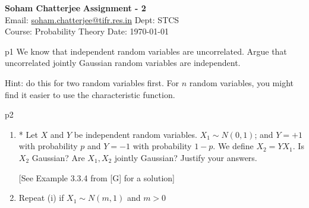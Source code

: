 \documentclass[a4paper, 11pt]{article}
\begin{document}
	
	
	\textsf{\noindent \large\textbf{Soham Chatterjee} \hfill \textbf{Assignment - 2}\\
		Email: \href{soham.chatterjee@tifr.res.in}{soham.chatterjee@tifr.res.in} \hfill Dept: STCS\\
		\normalsize Course: Probability Theory \hfill Date: \today}
	
	
\begin{problem}{%
	}{p1%
}
We know that independent random variables are uncorrelated. Argue that uncorrelated
jointly Gaussian random variables are independent.

Hint: do this for two random variables first. For $n$ random variables, you might find it
easier to use the characteristic function.
\end{problem}

\begin{problem}{%
	}{p2%
	}
\begin{enumerate}[label=(\roman*)]
	\item * Let $X$ and $Y$ be independent random variables. $X_1\sim N(0,1)$; and $Y=+1$ with probability $p$ and $Y=-1$ with probability $1-p$. We define $X_2=YX_1$. Is $X_2$ Gaussian? Are $X_1,X_2$ jointly Gaussian? Justify your answers.
	
	[See Example 3.3.4 from [G] for a solution]
	\item Repeat (i) if $X_1\sim N(m,1)$ and $m>0$
\end{enumerate}
\end{problem}
\solve{
	
}
\end{document}
